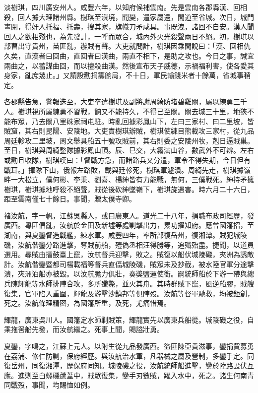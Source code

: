 \begin{pinyinscope}
淡樹琪，四川廣安州人。咸豐六年，以知府候補雲南。先是雲南各郡縣漢、回相殺，回人據大理諸州縣。樹琪至滇境，聞變，遣家屬還，間道至省城。次日，城門晝閉，得奸人托福、托壽，搜其家，旗幟刀矛咸具。事既洩，諸回不自安。漢人聞回人之欲相殘也，為先發計，一呼而眾合，城內外火光殺聲兩日不絕。初，樹琪以部曹出守貴州，苗匪亂，辦賊有聲。大吏就問計，樹琪因乘間說曰：「漢、回相仇久矣，直漢者曰回曲，直回者曰漢曲，兩直不相下，是助之攻也。今日之事，誠宜兩曲之，以蓄謀曲回，而以擅殺曲漢。然後宣布天子威德，示禍福利害，使各愛其身家，亂庶幾止。」又請設勸捐籌餉局，不十日，軍民輸錢米者十餘萬，省城事稍定。

各郡縣告急，警報迭至，大吏卒遣樹琪及副將謝周綺防堵碧雞關，屬以練勇三千人。樹琪視所屬練勇不習戰，餉又不能持久，不得已至關。關去城三十里，地狹不能布眾，乃去關八里硃家祠屯駐。時亂回據彩鳳山下，左曰三家村、曰二里坡，皆賊窟，其右則昆陽、安陵地。大吏責樹琪辦賊，樹琪使練目熊載攻三家村，從九品周廷軫攻二里坡，周文舉具船五十號攻賊前，其右則委之安陵州牧，剋日逼賊巢。至日，樹琪與周綺整隊據彩鳳山頂。辰、巳交，大霧滿山谷，數武外不可辨。左右或勸且收隊，樹琪嘆曰：「督戰方急，而諸路兵又分遣，軍令不得失期，今日但有戰耳。」揮隊下山，俄報左路敗，載與廷軫死，樹琪軍遽潰。周綺先走，樹琪據嶺畔一大松立，僕何彬、李秉、劉喜、楊紳皆有力能戰，無何，三僕戰死。紳持矛擁樹琪，樹琪據地呼殺不絕聲，賊從後砍紳墜嶺下，樹琪旋遇害。時六月二十六日，距至雲南僅七十餘日。事聞，贈太僕寺卿。

褚汝航，字一帆，江蘇吳縣人，或曰廣東人。道光二十八年，捐職布政司經歷，發廣西。粵匪倡亂，汝航於金田及新墟等處剿擊出力，累功擢知府。應曾國籓招，至湖南，與夏鑾督造戰艦，練水軍。咸豐四年，率所部復岳州，復湘潭。賊犯城陵磯，汝航偕鑾分路進擊，奪賊前船，殪偽丞相汪得勝等，追殲殆盡。捷聞，以道員選用。尋賊由擂鼓臺上竄，汝航督兵迎擊，敗之。賊復以船伏城陵磯，夾洲為誘敵計。汝航偕鑾暨都司楊載福等督兵直偪城陵磯，賊眾未及抄截，被水陸官軍分途擊潰，夾洲泊船亦被毀。以汝航膽力俱壯，奏獎鹽運使銜。嗣統師船於下游一帶與總兵陳輝龍等水師排陣合攻，多所殲斃，並火其舟。其時群賊下竄，風逆船膠，賊艘復集，官軍陷入重圍，輝龍及游擊沙鎮邦等俱陣歿。汝航等督軍馳救，均被鉅創，死之。汝航條理精密，為國籓所重，及死，尤痛惜焉。

輝龍，廣東吳川人。國籓定水師剿賊策，輝龍實先以廣東兵船從。城陵磯之役，自乘拖罟船先發，而汝航繼之。死事上聞，賜謚壯勇。

夏鑾，字鳴之，江蘇上元人。以附生從九品發廣西。盜匪陳亞貴滋事，鑾捐貲募勇在荔浦、修仁防剿，保府經歷。與汝航治水軍，凡器械之屬及營制，多鑾手定。同復岳州，同復湘潭，歷保府同知。城陵磯之役，汝航統師船進擊，鑾於陸路設伏互應。進剿至白螺磯蘆葦中，賊眾復集，鑾手刃數賊，躍入水中，死之。諸生何南青同戰歿，事聞，均賜恤如例。


\end{pinyinscope}
